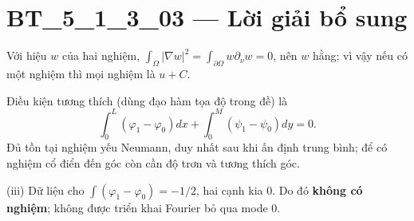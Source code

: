 \documentclass[10pt,a4paper]{article}
\begin{document}
\section*{BT\_5\_1\_3\_03 — Lời giải bổ sung}
Với hiệu $w$ của hai nghiệm, $\int_\Omega|\nabla w|^2=\int_{\partial\Omega}w\partial_\nu w=0$, nên $w$ hằng; vì vậy nếu có một nghiệm thì mọi nghiệm là $u+C$.

Điều kiện tương thích (dùng đạo hàm tọa độ trong đề) là
\[\int_0^L(\varphi_1-\varphi_0)dx+\int_0^M(\psi_1-\psi_0)dy=0.\]
Đủ tồn tại nghiệm yếu Neumann, duy nhất sau khi ấn định trung bình; để có nghiệm cổ điển đến góc còn cần độ trơn và tương thích góc.

(iii) Dữ liệu cho $\int(\varphi_1-\varphi_0)=-1/2$, hai cạnh kia 0. Do đó \textbf{không có nghiệm}; không được triển khai Fourier bỏ qua mode 0.
\end{document}
